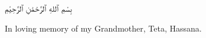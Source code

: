 
\thispagestyle{empty}
\vspace*{\fill}

\begin{center}
{\Huge\arabicfont
بِسْمِ ٱللهِ ٱلرَّحْمَٰنِ ٱلرَّحِيْمِ
}

\vspace{2em}

{\large In loving memory of my Grandmother, Teta, Hassana.}
\end{center}

\vspace*{\fill}
\clearpage